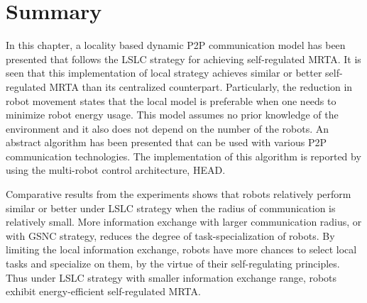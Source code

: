 \section{Summary}
\label{loacl-comm:summary}
In this chapter, a locality based dynamic P2P communication model  has been presented that follows the LSLC strategy for achieving self-regulated MRTA. It is seen that this implementation of local strategy achieves similar or better self-regulated MRTA than its centralized counterpart. Particularly, the reduction in robot movement states that the local model is preferable when one needs to minimize robot energy usage. This model assumes no prior knowledge of the environment and it also does not depend on the number of the robots.  An abstract algorithm has been presented that can be used with various P2P communication technologies. The implementation of this algorithm is reported by using the multi-robot control architecture, HEAD.

Comparative results from the experiments shows that robots relatively perform similar or better under LSLC strategy when the radius of communication is relatively small. More information exchange with larger communication radius, or with GSNC strategy, reduces the degree of task-specialization of robots. By limiting the local information exchange, robots have more chances to select local tasks and specialize on them, by the virtue of their self-regulating principles. Thus under LSLC strategy with smaller information exchange range, robots exhibit energy-efficient self-regulated MRTA.